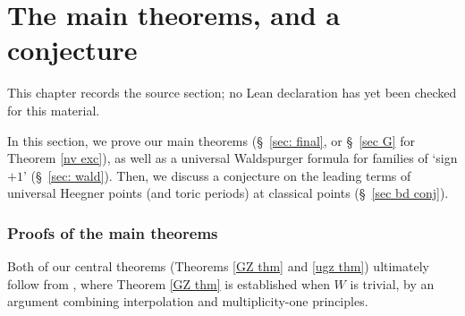 \chapter{The main theorems, and a conjecture}
\label{universal-p-adic-gross-zagier-formula-chapter-07}

\begin{remark}
\label{universal-p-adic-gross-zagier-formula-chapter-07-source}
This chapter records the source section; no Lean declaration has yet been checked for this material.
\notready
\end{remark}

In this section, we prove our main theorems (\S~\ref{sec: final}, or \S~\ref{sec G} for  Theorem \ref{nv exc}), as well as a universal Waldspurger formula for  families of `sign $+1$' (\S~\ref{sec: wald}). Then, we discuss a conjecture on the leading terms of universal Heegner points (and toric periods) at classical points (\S~\ref{sec bd conj}).













































\subsection{Proofs of the main theorems}
Both of our central  theorems (Theorems \ref{GZ thm} and \ref{ugz thm}) ultimately follow from \cite{dd-pyzz,nonsplit}, where Theorem \ref{GZ thm} is established when $W$ is trivial, by an argument combining interpolation and multiplicity-one principles.


